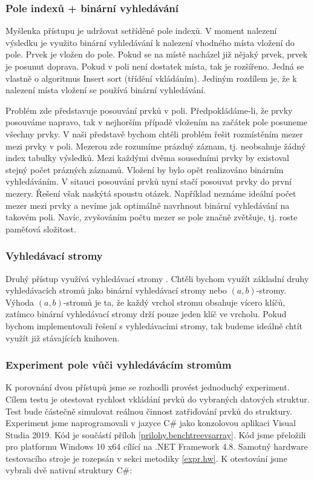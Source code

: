 \subsubsection{Pole indexů + binární vyhledávání}

Myšlenka přístupu je udržovat setříděné pole indexů. 
V moment nalezení výsledku je využito binární vyhledávání \citep[str. 26]{labyrint} k nalezení vhodného místa vložení do pole.
Prvek je vložen do pole.
Pokud se na místě nacházel již nějaký prvek, prvek je posunut doprava.
Pokud v poli není dostatek místa, tak je rozšířeno.
Jedná se vlastně o algoritmus Insert sort (třídění vkládáním).
Jediným rozdílem je, že k nalezení místa vložení se používá binární vyhledávání.

Problém zde představuje posouvání prvků v poli.
Předpokládáme-li, že prvky posouváme napravo, tak v nejhorším případě vložením na začátek pole posuneme všechny prvky.
V naši představě bychom chtěli problém řešit rozmístěním mezer mezi prvky v poli.
Mezerou zde rozumíme prázdný záznam, tj. neobsahuje žádný index tabulky výsledků.
Mezi každými dvěma sousedními prvky by existoval stejný počet prázných záznamů.
Vložení by bylo opět realizováno binárním vyhledáváním.
V sitauci posouvání prvků nyní stačí posouvat prvky do první mezery.
Řešení však naskýtá spoustu otázek.
Například neznáme ideální počet mezer mezi prvky a nevíme jak optimálně navrhnout binární vyhledávání na takovém poli.
Navíc, zvyšováním počtu mezer se pole značně zvětšuje, tj. roste paměťová složitost.

\subsubsection{Vyhledávací stromy}

Druhý přístup využívá vyhledávací stromy \citep[str. 177]{labyrint}.
Chtěli bychom využít základní druhy vyhledávacích stromů jako binární vyhledávací stromy nebo $(a, b)$-stromy.
Výhoda $(a, b)$-stromů je ta, že každý vrchol stromu obsahuje vícero klíčů, zatímco binární vyhledávací stromy drží pouze jeden klíč ve vrcholu.
Pokud bychom implementovali řešení s vyhledávacími stromy, tak budeme ideálně chtít využít již stávajících knihoven.

\subsubsection{Experiment pole vůči vyhledávácím stromům}

K porovnání dvou přístupů jsme se rozhodli provést jednoduchý experiment.
Cílem testu je otestovat rychlost vkládání prvků do vybraných datových struktur.
Test bude částečně simulovat reálnou činnost zatřiďování prvků do struktury.
Experiment jsme naprogramovali v jazyce C\# jako konzolovou aplikaci Visual Studia 2019.
Kód je součástí příloh \ref{prilohy.benchtreevsarray}.
Kód jsme přeložili pro platformu Windows 10 x64 cílící na .NET Framework 4.8.
Samotný hardware testovacího stroje je rozepsán v sekci metodiky \ref{expr.hw}.
K otestování jsme vybrali dvě nativní struktury C\#:

